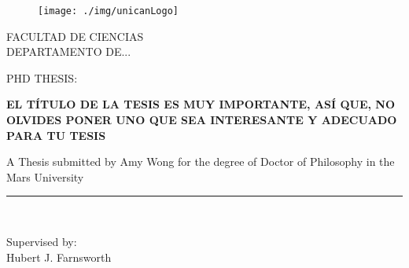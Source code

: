 \documentclass[a4paper,12pt, twoside, openright,makeidx]{book}
\title{\titulo}
\author{\autor}
\begin{document}
\begin{titlepage}

\begin{center}
\vspace*{-1in}
\begin{figure}[htb]
\begin{center}
\texttt{[image: ./img/unicanLogo]}
\end{center}
\end{figure}

FACULTAD DE CIENCIAS\\
\vspace*{0.15in}
DEPARTAMENTO DE... \\
\vspace*{0.6in}
\begin{large}
PHD THESIS:\\
\end{large}
\vspace*{0.2in}
\begin{Large}
\textbf{EL TÍTULO DE LA TESIS ES MUY IMPORTANTE, ASÍ QUE, NO OLVIDES PONER UNO QUE SEA INTERESANTE Y ADECUADO PARA TU TESIS} \\
\end{Large}
\vspace*{0.3in}
\begin{large}
A Thesis submitted by Amy Wong for the degree of Doctor of Philosophy in the Mars University\\
\end{large}
\vspace*{0.3in}
\rule{80mm}{0.1mm}\\
\vspace*{0.1in}
\begin{large}
  \begin{flushleft}
Supervised by: \\
Hubert J. Farnsworth \\
\end{flushleft}

\end{large}
\end{center}

\end{titlepage}

\tableofcontents{}
\listoffigures
\end{document}
